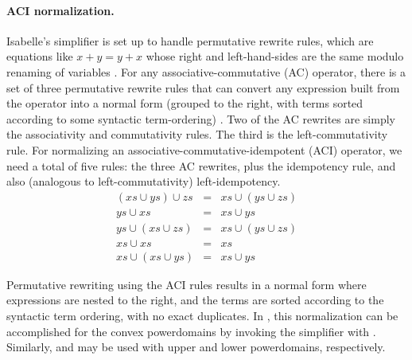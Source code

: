 \paragraph{ACI normalization.} Isabelle's simplifier is set up to handle permutative rewrite rules, which are equations like $x+y=y+x$ whose right and left-hand-sides are the same modulo renaming of variables \cite{isabelle-tutorial}. For any associative-commutative (AC) operator, there is a set of three permutative rewrite rules that can convert any expression built from the operator into a normal form (grouped to the right, with terms sorted according to some syntactic term-ordering) \cite{baader1998}. Two of the AC rewrites are simply the associativity and commutativity rules. The third is the left-commutativity rule. For normalizing an associative-commutative-idempotent (ACI) operator, we need a total of five rules: the three AC rewrites, plus the idempotency rule, and also (analogous to left-commutativity) left-idempotency.
\begin{eqnarray}
(xs\cup ys)\cup zs & = & xs\cup(ys\cup zs)\nonumber \\
ys\cup xs & = & xs\cup ys\nonumber \\
ys\cup(xs\cup zs) & = & xs\cup(ys\cup zs)\label{eq:plus-aci}\\
xs\cup xs & = & xs\nonumber \\
xs\cup(xs\cup ys) & = & xs\cup ys\nonumber
\end{eqnarray}

Permutative rewriting using the ACI rules results in a normal form where expressions are nested to the right, and the terms are sorted according to the syntactic term ordering, with no exact duplicates. In , this normalization can be accomplished for the convex powerdomains by invoking the simplifier with . Similarly,  and  may be used with upper and lower powerdomains, respectively.


